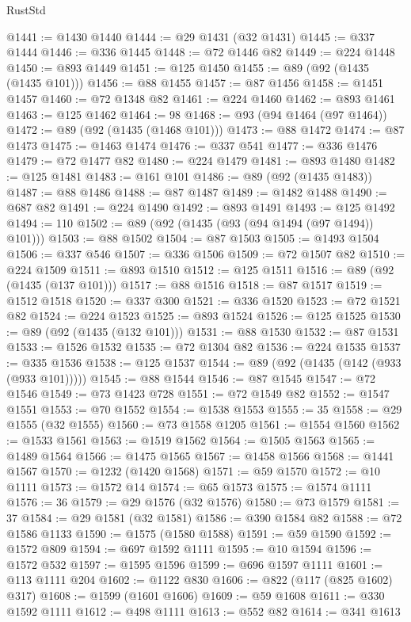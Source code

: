 \begin{lexlean}{RustStd}
\begin{coremodule}
@1441 := @1430 @1440
@1444 := @29 @1431 (@32 @1431)
@1445 := @337 @1444
@1446 := @336 @1445
@1448 := @72 @1446 @82
@1449 := @224 @1448
@1450 := @893 @1449
@1451 := @125 @1450
@1455 := @89 (@92 (@1435 (@1435 @101)))
@1456 := @88 @1455
@1457 := @87 @1456
@1458 := @1451 @1457
@1460 := @72 @1348 @82
@1461 := @224 @1460
@1462 := @893 @1461
@1463 := @125 @1462
@1464 := 98
@1468 := @93 (@94 @1464 (@97 @1464))
@1472 := @89 (@92 (@1435 (@1468 @101)))
@1473 := @88 @1472
@1474 := @87 @1473
@1475 := @1463 @1474
@1476 := @337 @541
@1477 := @336 @1476
@1479 := @72 @1477 @82
@1480 := @224 @1479
@1481 := @893 @1480
@1482 := @125 @1481
@1483 := @161 @101
@1486 := @89 (@92 (@1435 @1483))
@1487 := @88 @1486
@1488 := @87 @1487
@1489 := @1482 @1488
@1490 := @687 @82
@1491 := @224 @1490
@1492 := @893 @1491
@1493 := @125 @1492
@1494 := 110
@1502 := @89 (@92 (@1435 (@93 (@94 @1494 (@97 @1494)) @101)))
@1503 := @88 @1502
@1504 := @87 @1503
@1505 := @1493 @1504
@1506 := @337 @546
@1507 := @336 @1506
@1509 := @72 @1507 @82
@1510 := @224 @1509
@1511 := @893 @1510
@1512 := @125 @1511
@1516 := @89 (@92 (@1435 (@137 @101)))
@1517 := @88 @1516
@1518 := @87 @1517
@1519 := @1512 @1518
@1520 := @337 @300
@1521 := @336 @1520
@1523 := @72 @1521 @82
@1524 := @224 @1523
@1525 := @893 @1524
@1526 := @125 @1525
@1530 := @89 (@92 (@1435 (@132 @101)))
@1531 := @88 @1530
@1532 := @87 @1531
@1533 := @1526 @1532
@1535 := @72 @1304 @82
@1536 := @224 @1535
@1537 := @335 @1536
@1538 := @125 @1537
@1544 := @89 (@92 (@1435 (@142 (@933 (@933 @101)))))
@1545 := @88 @1544
@1546 := @87 @1545
@1547 := @72 @1546
@1549 := @73 @1423 @728
@1551 := @72 @1549 @82
@1552 := @1547 @1551
@1553 := @70 @1552
@1554 := @1538 @1553
@1555 := 35
@1558 := @29 @1555 (@32 @1555)
@1560 := @73 @1558 @1205
@1561 := @1554 @1560
@1562 := @1533 @1561
@1563 := @1519 @1562
@1564 := @1505 @1563
@1565 := @1489 @1564
@1566 := @1475 @1565
@1567 := @1458 @1566
@1568 := @1441 @1567
@1570 := @1232 (@1420 @1568)
@1571 := @59 @1570
@1572 := @10 @1111
@1573 := @1572 @14
@1574 := @65 @1573
@1575 := @1574 @1111
@1576 := 36
@1579 := @29 @1576 (@32 @1576)
@1580 := @73 @1579
@1581 := 37
@1584 := @29 @1581 (@32 @1581)
@1586 := @390 @1584 @82
@1588 := @72 @1586 @1133
@1590 := @1575 (@1580 @1588)
@1591 := @59 @1590
@1592 := @1572 @809
@1594 := @697 @1592 @1111
@1595 := @10 @1594
@1596 := @1572 @532
@1597 := @1595 @1596
@1599 := @696 @1597 @1111
@1601 := @113 @1111 @204
@1602 := @1122 @830
@1606 := @822 (@117 (@825 @1602) @317)
@1608 := @1599 (@1601 @1606)
@1609 := @59 @1608
@1611 := @330 @1592 @1111
@1612 := @498 @1111
@1613 := @552 @82
@1614 := @341 @1613

\end{coremodule}
\end{lexlean}
